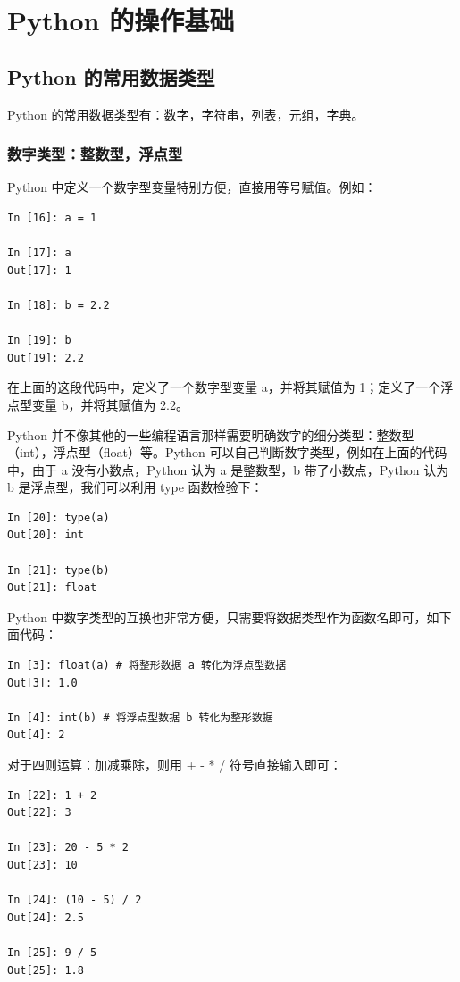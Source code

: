 
\chapter{Python 的操作基础}

\section{Python 的常用数据类型}

Python 的常用数据类型有：数字，字符串，列表，元组，字典。

\subsection{数字类型：整数型，浮点型}

Python 中定义一个数字型变量特别方便，直接用等号赋值。例如：

\begin{lstlisting}[Language=Python]
In [16]: a = 1

In [17]: a
Out[17]: 1

In [18]: b = 2.2

In [19]: b
Out[19]: 2.2
\end{lstlisting}

在上面的这段代码中，定义了一个数字型变量 a，并将其赋值为 1；定义了一个浮点型变量 b，并将其赋值为 2.2。


Python 并不像其他的一些编程语言那样需要明确数字的细分类型：整数型（int），浮点型（float）等。Python 可以自己判断数字类型，例如在上面的代码中，由于 a 没有小数点，Python 认为 a 是整数型，b 带了小数点，Python 认为 b 是浮点型，我们可以利用 type 函数检验下：

\begin{lstlisting}[Language=Python]
In [20]: type(a)
Out[20]: int

In [21]: type(b)
Out[21]: float
\end{lstlisting}


Python 中数字类型的互换也非常方便，只需要将数据类型作为函数名即可，如下面代码：

\begin{lstlisting}[Language=Python]
In [3]: float(a) # 将整形数据 a 转化为浮点型数据
Out[3]: 1.0

In [4]: int(b) # 将浮点型数据 b 转化为整形数据
Out[4]: 2
\end{lstlisting}

对于四则运算：加减乘除，则用 + - * / 符号直接输入即可：

\begin{lstlisting}[Language=Python]
In [22]: 1 + 2
Out[22]: 3

In [23]: 20 - 5 * 2
Out[23]: 10

In [24]: (10 - 5) / 2
Out[24]: 2.5

In [25]: 9 / 5
Out[25]: 1.8
\end{lstlisting}

